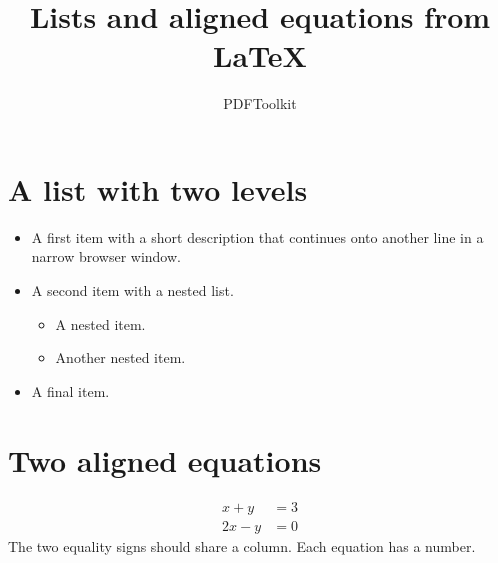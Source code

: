 \documentclass{article}
\title{Lists and aligned equations from LaTeX}
\author{PDFToolkit}
\date{}
\begin{document}
\maketitle
\thispagestyle{empty}

\section{A list with two levels}
\begin{itemize}
\item A first item with a short description that continues onto another line in a narrow browser window.
\item A second item with a nested list.
  \begin{itemize}
  \item A nested item.
  \item Another nested item.
  \end{itemize}
\item A final item.
\end{itemize}

\section{Two aligned equations}
\begin{align}
  x+y &= 3 \\
  2x-y &= 0
\end{align}
The two equality signs should share a column. Each equation has a number.
\end{document}
